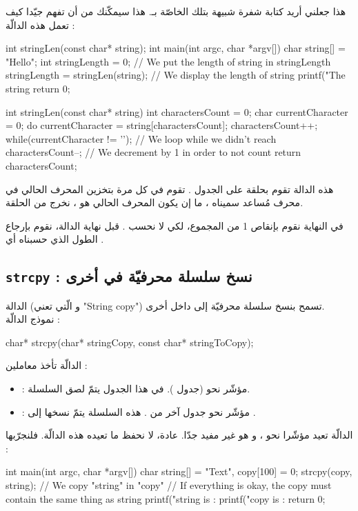 هذا جعلني أريد كتابة شفرة شبيهة بتلك الخاصّة بـ. هذا سيمكّنك من أن تفهم جيّدا كيف تعمل هذه الدالّة :

\begin{Csource}
int stringLen(const char* string);
int main(int argc, char *argv[])
{
	char string[] = "Hello";
	int stringLength = 0;
	// We put the length of string in stringLength
	stringLength = stringLen(string);
	// We display the length of string
	printf("The string %
	return 0;
}

int stringLen(const char* string)
{
	int charactersCount = 0;
	char currentCharacter = 0;
	do
	{
    	 	currentCharacter = string[charactersCount];
    	 	charactersCount++;
	}
	while(currentCharacter != '\0'); // We loop while we didn't reach \0
	charactersCount--; // We decrement by 1 in order to not count \0
	return charactersCount;
}
\end{Csource}

هذه الدالة
تقوم بحلقة على الجدول
.
تقوم في كل مرة بتخزين المحرف الحالي في محرف مُساعد سميناه
،
ما إن يكون المحرف الحالي هو
،
نخرج من الحلقة.

في النهاية نقوم بإنقاص 1 من المجموع، لكي لا نحسب
.
 قبل نهاية الدالة، نقوم بإرجاع الطول الذي حسبناه أي
.

\subsection{\texttt{strcpy} : نسخ سلسلة محرفيّة في أخرى}

الدالة
(و الّتي تعني "\textenglish{String copy}")
تسمح بنسخ سلسلة محرفيّة إلى داخل أخرى.\\
نموذج الدالّة :

\begin{Csource}
char* strcpy(char* stringCopy, const char* stringToCopy);
\end{Csource}

الدالّة تأخذ معاملين :

\begin{itemize}
  \item {} : مؤشّر نحو  (جدول ). في هذا الجدول يتمّ لصق السلسلة.
  \item {} : مؤشّر نحو جدول آخر من . هذه السلسلة يتمّ نسخها إلى .
\end{itemize}
الدالّة تعيد مؤشّرا نحو
،
و هو غير مفيد جدّا. عادة، لا نحفظ ما تعيده هذه الدالّة. فلنجرّبها :
\begin{Csource}
int main(int argc, char *argv[])
{
	char string[] = "Text", copy[100] = {0};
	strcpy(copy, string); // We copy "string" in "copy"
	// If everything is okay, the copy must contain the same thing as string
	printf("string is : %
	printf("copy  is : %
	return 0;
}
\end{Csource}

